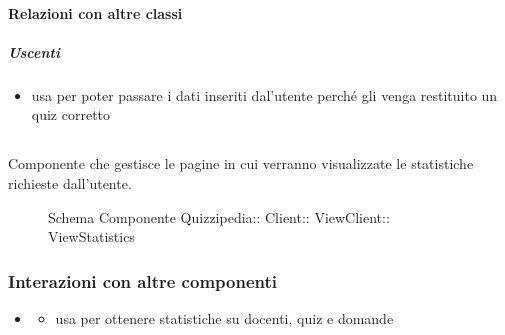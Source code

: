 \paragraph{Relazioni con altre classi}
\subparagraph{Uscenti}
\begin{itemize}
\item usa  per poter passare i dati inseriti dal'utente perché gli venga restituito un quiz corretto
\end{itemize}
\subsection{}
Componente che gestisce le pagine in cui verranno visualizzate le statistiche richieste dall'utente.
\begin{figure}[H]
\centering
\noindent{}
\caption[Schema Componente ViewStatistics]{Schema Componente Quizzipedia:: Client:: ViewClient:: ViewStatistics}
\end{figure}
\subsubsection{Interazioni con altre componenti}
\begin{itemize}
\item {}
\begin{itemize}
\item usa  per ottenere statistiche su docenti, quiz e domande
\end{itemize}
\end{itemize}
